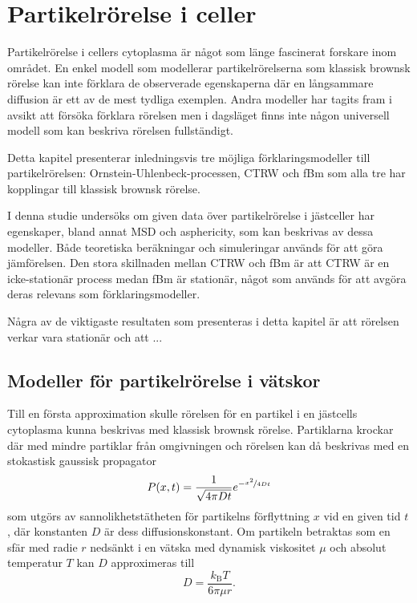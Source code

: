 \chapter{Partikelrörelse i celler}

Partikelrörelse i cellers cytoplasma är något som länge fascinerat forskare inom området. En enkel modell som modellerar partikelrörelserna som klassisk brownsk rörelse kan inte förklara de observerade egenskaperna där en långsammare diffusion är ett av de mest tydliga exemplen. Andra modeller har tagits fram i avsikt att försöka förklara rörelsen men i dagsläget finns inte någon universell modell som kan beskriva rörelsen fullständigt. 

Detta kapitel presenterar inledningsvis tre möjliga förklaringsmodeller till partikelrörelsen:  Ornstein-Uhlenbeck-processen, CTRW och fBm som alla tre har kopplingar till klassisk brownsk rörelse. 

I denna studie undersöks om given data över partikelrörelse i jästceller har egenskaper, bland annat MSD och asphericity, som kan beskrivas av dessa modeller. Både teoretiska beräkningar och simuleringar används för att göra jämförelsen. Den stora skillnaden mellan CTRW och fBm är att CTRW är en icke-stationär process medan fBm är stationär, något som används för att avgöra deras relevans som förklaringsmodeller. 

Några av de viktigaste resultaten som presenteras i detta kapitel är att rörelsen verkar vara stationär och att ... 



\section{Modeller för partikelrörelse i vätskor}

Till en första approximation skulle rörelsen för en partikel i en jästcells cytoplasma kunna beskrivas med klassisk brownsk rörelse. Partiklarna krockar där med mindre partiklar från omgivningen och rörelsen kan då beskrivas med en stokastisk gaussisk propagator~\cite{Einstein1905}
\begin{equation}
P(x,t)=\frac{1}{\sqrt{4\pi Dt}}e^{-\nicefrac{x^2}{4Dt}}
\end{equation} %
som utgörs av sannolikhetstätheten för partikelns förflyttning $x$ vid en given tid $t$, där konstanten $D$ är dess diffusionskonstant. Om partikeln betraktas som en sfär med radie $r$ nedsänkt i en vätska med dynamisk viskositet $\mu$ och absolut temperatur $T$ kan $D$ approximeras till~\cite{Einstein1905}
\begin{equation}
D=\frac{k_\text{B} T}{6\pi \mu r}.
\end{equation}

